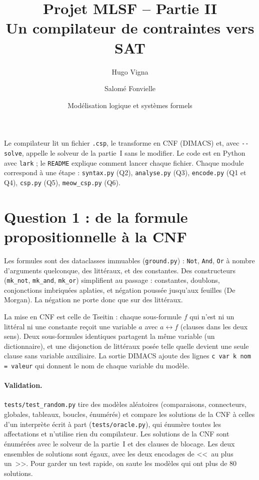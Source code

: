 \documentclass[11pt,a4paper]{article}
\title{Projet MLSF -- Partie II\\Un compilateur de contraintes vers SAT}
\author{Hugo Vigna \and Salomé Fonvielle}
\date{Modélisation logique et systèmes formels}
\newcommand{\f}[1]{\texttt{#1}}
\begin{document}
\maketitle

Le compilateur lit un fichier \f{.csp}, le transforme en CNF (DIMACS) et, avec \f{-{}-solve}, appelle le solveur de la partie~I sans le modifier. Le code est en Python avec \f{lark} ; le \f{README} explique comment lancer chaque fichier. Chaque module correspond à une étape : \f{syntax.py} (Q2), \f{analyse.py} (Q3), \f{encode.py} (Q1 et Q4), \f{csp.py} (Q5), \f{meow\_csp.py} (Q6).

\section*{Question 1 : de la formule propositionnelle à la CNF}

Les formules sont des dataclasses immuables (\f{ground.py}) : \f{Not}, \f{And}, \f{Or} à nombre d'arguments quelconque, des littéraux, et des constantes. Des constructeurs (\f{mk\_not}, \f{mk\_and}, \f{mk\_or}) simplifient au passage : constantes, doublons, conjonctions imbriquées aplaties, et négation poussée jusqu'aux feuilles (De Morgan). La négation ne porte donc que sur des littéraux.

La mise en CNF est celle de Tseitin : chaque sous-formule $f$ qui n'est ni un littéral ni une constante reçoit une variable $a$ avec $a\leftrightarrow f$ (clauses dans les deux sens). Deux sous-formules identiques partagent la même variable (un dictionnaire), et une disjonction de littéraux posée telle quelle devient une seule clause sans variable auxiliaire. La sortie DIMACS ajoute des lignes \f{c var k nom = valeur} qui donnent le nom de chaque variable du modèle.

\paragraph{Validation.} \f{tests/test\_random.py} tire des modèles aléatoires (comparaisons, connecteurs, globales, tableaux, boucles, énumérés) et compare les solutions de la CNF à celles d'un interprète écrit à part (\f{tests/oracle.py}), qui énumère toutes les affectations et n'utilise rien du compilateur. Les solutions de la CNF sont énumérées avec le solveur de la partie~I et des clauses de blocage. Les deux ensembles de solutions sont égaux, avec les deux encodages de <<~au plus un~>>. Pour garder un test rapide, on saute les modèles qui ont plus de 80 solutions.
\end{document}
